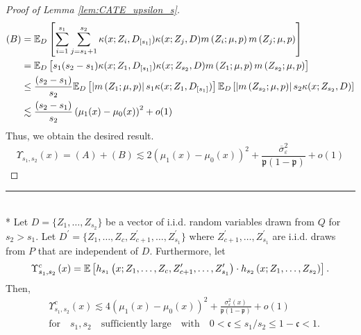 \begin{proof}[Proof of Lemma \ref{lem:CATE_upsilon_s}]
\begin{equation}
\begin{aligned}
			(B)
			& = \mathbb{E}_{D}\left[\sum_{i = 1}^{s_1}\sum_{j = s_1 + 1}^{s_2}\kappa(x; Z_{i}, D_{[s_1]})\kappa(x; Z_{j}, D) m\left(Z_{i}; \mu, p\right)m\left(Z_{j}; \mu, p\right)\right] \\
			& = \mathbb{E}_{D}\left[s_1(s_2 - s_1) \kappa(x; Z_{1}, D_{[s_1]})\kappa(x; Z_{s_2}, D) m\left(Z_{1}; \mu, p\right) m\left(Z_{s_2}; \mu, p\right)\right]\\
			& \leq \frac{(s_2 - s_1)}{s_2}\mathbb{E}_{D}\left[\left|m\left(Z_{1}; \mu, p\right)\right| s_1 \kappa(x; Z_{1}, D_{[s_1]})\right]
			\mathbb{E}_{D}\left[\left|m\left(Z_{s_2}; \mu, p\right)\right| s_2\kappa(x; Z_{s_2}, D) \right]\\
			& \lesssim \frac{(s_2 - s_1)}{s_2} \left(\mu_1(x) - \mu_0(x)\right)^2 + o(1)
		\end{aligned}
	\end{equation}
	Thus, we obtain the desired result.
	\begin{equation}
		\Upsilon_{s_1, s_2}\left(x\right)
		= (A) + (B)
		\lesssim  2\left(\mu_1(x) - \mu_0(x)\right)^2 + \frac{\overline{\sigma}^2_{\varepsilon}}{\mathfrak{p}(1 - \mathfrak{p})} + o(1)
	\end{equation}
\end{proof}
\hrule 

\begin{lem}\label{lem:CATE_upsilon_sc}\mbox{}\\*
	Let $D = \{Z_1, \dotsc, Z_{s_2}\}$ be a vector of i.i.d. random variables drawn from $Q$ for $s_2 > s_1$.
	Let $D^{\prime} = \{Z_1, \dotsc, Z_{c}, Z_{c+1}^{\prime}, \dotsc,  Z_{s_1}^{\prime}\}$ where $Z_{c+1}^{\prime}, \dotsc,  Z_{s_1}^{\prime}$ are i.i.d. draws from $P$ that are independent of $D$.
	Furthermore, let
	\begin{equation}
		\Upsilon_{s_1, s_2}^{c}\left(x\right)
		= \mathbb{E}\left[h_{s_1}\left(x; Z_1, \ldots, Z_c, Z^{\prime}_{c+1}, \ldots,  Z^{\prime}_{s_1}\right) \cdot
			h_{s_2}\left(x; Z_1, \ldots, Z_{s_2}\right)\right].
	\end{equation}
	Then,
	\begin{equation}
		\begin{aligned}
			 & \Upsilon_{s_1, s_2}^{c}\left(x\right)
			\lesssim 4 \left(\mu_1(x) - \mu_0(x)\right)^2 + \frac{\sigma^2_{\varepsilon}(x)}{\mathfrak{p}(1 - \mathfrak{p})} + o(1) \\
			 & \text{for} \quad s_1, s_2 \quad \text{sufficiently large}
			\quad \text{with} \quad
			0 < \mathfrak{c} \leq s_1 / s_2 \leq 1 - \mathfrak{c} < 1.
		\end{aligned}
	\end{equation}
\end{lem}

